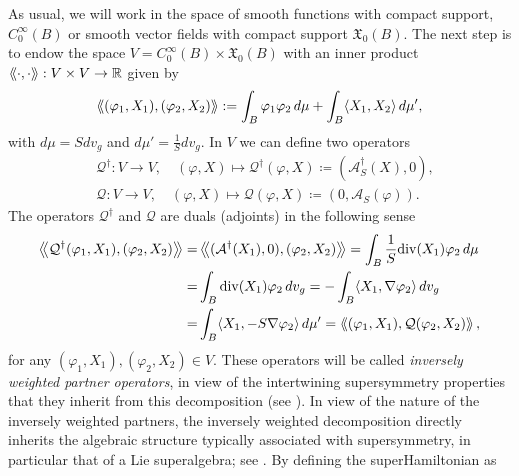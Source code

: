 \documentclass{amsart}
\theoremstyle{definition}
\theoremstyle{remark}
\numberwithin{equation}{section}
\newcommand{\diver}{{{\mathrm{div}}}}
\begin{document}
As usual, we will work in the space of smooth functions with compact support, $C^\infty_0(B)$  or smooth vector fields with compact support $\mathfrak{X}_0(B)$.
The next step is to endow the space $V=C^\infty_0(B)\times \mathfrak{X}_0(B)$ with an inner product
$
\langle\hskip-2pt\langle \cdot , \cdot \rangle\hskip-2pt\rangle : V \times V \to \mathbb{R}$ given by
$$
\left\langle\mkern-4mu\left\langle (\varphi_1,X_1), (\varphi_2,X_2) \right\rangle\mkern-4mu\right\rangle := \int_B \varphi_1\varphi_2 \, d\mu + \int_B \langle X_1, X_2 \rangle \, d\mu',
$$
with $d\mu=Sdv_g$ and $d\mu'=\frac{1}{S}dv_g$.
In $V$ we can define two operators 
$$
\begin{aligned}
&\mathcal{Q}^\dag:V\to V, \quad (\varphi,X)\mapsto \mathcal{Q}^\dag (\varphi,X)\coloneq(\mathcal{A}^\dag_S(X),0),\\
&\mathcal{Q}:V\to V, \quad (\varphi,X)\mapsto \mathcal{Q} (\varphi,X)\coloneq(0, \mathcal{A}_S(\varphi)).
\end{aligned}
$$
The operators $\mathcal{Q}^\dag$ and $\mathcal{Q}$ are duals (adjoints) in the following sense
$$
\begin{aligned}
    \left\langle\mkern-4mu\left\langle \mathcal{Q}^\dag(\varphi_1,X_1), (\varphi_2,X_2) \right\rangle\mkern-4mu\right\rangle=&\left\langle\mkern-4mu\left\langle (\mathcal{A}^\dag(X_1),0), (\varphi_2,X_2) \right\rangle\mkern-4mu\right\rangle=\int_B\frac{1}{S}\diver(X_1)\varphi_2\,  d\mu\\
    =&\int_B\diver(X_1)\varphi_2\,  dv_g=-\int_B\langle X_1, \nabla \varphi_2\rangle\,  dv_g\\
    =&\int_B\langle X_1, -S\nabla \varphi_2\rangle\,  d\mu'=\left\langle\mkern-4mu\left\langle (\varphi_1,X_1), \mathcal{Q}(\varphi_2,X_2) \right\rangle\mkern-4mu\right\rangle,
\end{aligned}
$$
for any $(\varphi_1,X_1),(\varphi_2,X_2)\in V$.
These operators will be called \emph{inversely weighted partner operators}, in view of the intertwining supersymmetry properties that they inherit from this decomposition (see \cite{InfeldHull1951, CooperKhareSukhatme1995, HouriSakamotoTatsumi2017}).
In view of the nature of the inversely weighted partners, the inversely weighted decomposition directly inherits the algebraic structure typically associated with supersymmetry, in particular that of a Lie superalgebra; see \cite{Scheunert1979}. 
By defining the superHamiltonian as 
\end{document}
